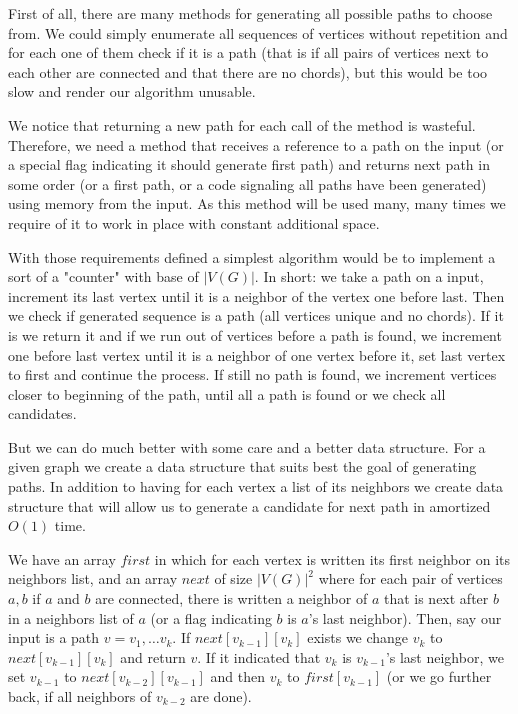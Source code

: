First of all, there are many methods for generating all possible paths to choose from. We could simply enumerate all sequences of vertices without repetition and for each one of them check if it is a path (that is if all pairs of vertices next to each other are connected and that there are no chords), but this would be too slow and render our algorithm unusable.

We notice that returning a new path for each call of the method is wasteful. Therefore, we need a method that receives a reference to a path on the input (or a special flag indicating it should generate first path) and returns next path in some order (or a first path, or a code signaling all paths have been generated) using memory from the input. As this method will be used many, many times we require of it to work in place with constant additional space.

With those requirements defined a simplest algorithm would be to implement a sort of a "counter" with base of $|V(G)|$. In short: we take a path on a input, increment its last vertex until it is a neighbor of the vertex one before last. Then we check if generated sequence is a path (all vertices unique and no chords). If it is we return it and if we run out of vertices before a path is found, we increment one before last vertex until it is a neighbor of one vertex before it, set last vertex to first and continue the process. If still no path is found, we increment vertices closer to beginning of the path, until all a path is found or we check all candidates.

But we can do much better with some care and a better data structure. For a given graph we create a data structure that suits best the goal of generating paths. In addition to having for each vertex a list of its neighbors we create data structure that will allow us to generate a candidate for next path in amortized $O(1)$ time.

We have an array $first$ in which for each vertex is written its first neighbor on its neighbors list, and an array $next$ of size $|V(G)|^2$ where for each pair of vertices $a, b$ if $a$ and $b$ are connected, there is written a neighbor of $a$ that is next after $b$ in a neighbors list of $a$ (or a flag indicating $b$ is $a$'s last neighbor). Then, say our input is a path $v = v_1, \ldots v_k$. If $next[v_{k-1}][v_k]$ exists we change $v_k$ to $next[v_{k-1}][v_k]$ and return $v$. If it indicated that $v_k$ is $v_{k-1}$'s last neighbor, we set $v_{k-1}$ to $next[v_{k-2}][v_{k-1}]$ and then $v_k$ to $first[v_{k-1}]$ (or we go further back, if all neighbors of $v_{k-2}$ are done).

